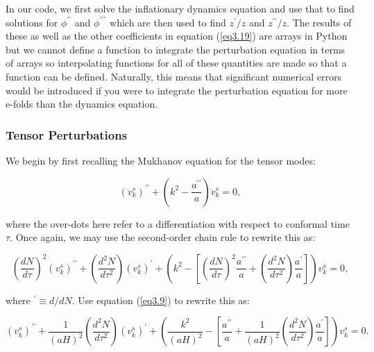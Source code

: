 \documentclass[a4paper,12pt,twoside]{report}
\begin{document}
In our code, we first solve the inflationary dynamics equation and use that to find solutions for $\phi^{\prime \prime}$ and $\phi^{\prime \prime \prime}$ which are then used to find $z^{\prime}/z$ and $z^{\prime \prime}/z$. The results of these as well as the other coefficients in equation (\ref{eq3.19}) are arrays in Python but we cannot define a function to integrate the perturbation equation in terms of arrays so interpolating functions for all of these quantities are made so that a function can be defined. Naturally, this means that significant numerical errors would be introduced if you were to integrate the perturbation equation for more e-folds than the dynamics equation.

\subsubsection{Tensor Perturbations} \label{subsubsec:TensPerts}

We begin by first recalling the Mukhanov equation for the tensor modes:

\begin{equation} \label{eq3.21}
(\ddot{v}^{s}_{k})^{\prime \prime} + \left(k^{2} - \frac{a^{\prime \prime}}{a} \right) \ddot{v}^{s}_{k} = 0,
\end{equation}

where the over-dots here refer to a differentiation with respect to conformal time $\tau$. Once again, we may use the second-order chain rule to rewrite this as:

\begin{equation} \label{eq3.22}
\left(\frac{dN}{d\tau}\right)^{2}(v^{s}_{k})^{\prime \prime} + \left(\frac{d^{2}N}{d\tau^{2}}\right)(v^{s}_{k})^{\prime} + \left( k^{2} - \left[\left( \frac{dN}{d\tau} \right)^{2} \frac{a^{\prime \prime}}{a} + \left( \frac{d^{2}N}{d\tau^{2}} \right) \frac{a^{\prime}}{a} \right] \right)v^{s}_{k} = 0,
\end{equation}

where $^{\prime} \equiv d/dN$. Use equation (\ref{eq3.9}) to rewrite this as:

\begin{equation} \label{eq3.23}
(v^{s}_{k})^{\prime \prime} + \frac{1}{(aH)^{2}}\left(\frac{d^{2}N}{d\tau^{2}}\right)(v^{s}_{k})^{\prime} + \left( \frac{k^{2}}{(aH)^{2}} - \left[ \frac{a^{\prime \prime}}{a} + \frac{1}{(aH)^{2}}\left( \frac{d^{2}N}{d\tau^{2}} \right) \frac{a^{\prime}}{a} \right] \right)v^{s}_{k} = 0.
\end{equation}
\end{document}
